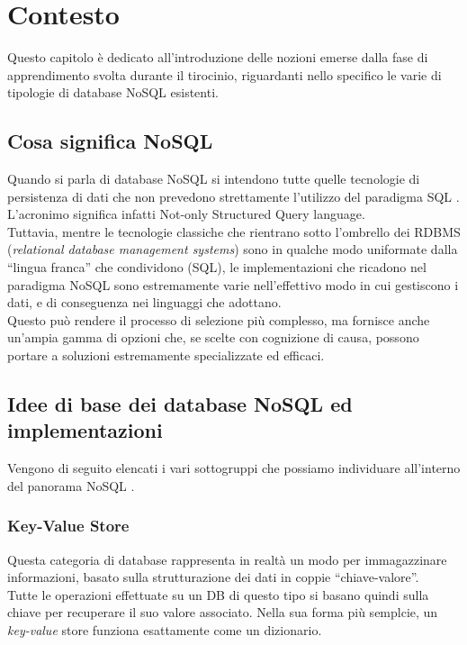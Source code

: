 
\chapter{Contesto}
\label{cap:contesto}

Questo capitolo è dedicato all'introduzione delle nozioni emerse dalla fase di apprendimento svolta durante il tirocinio, riguardanti nello specifico le varie di tipologie di database NoSQL esistenti.\\

\section{Cosa significa NoSQL}
Quando si parla di database NoSQL si intendono tutte quelle tecnologie di persistenza di dati che non prevedono strettamente l'utilizzo del paradigma \gls{SQL} \cite{site:mongoarticlenosql}. L'acronimo significa infatti Not-only Structured Query language.\\
Tuttavia, mentre le tecnologie classiche che rientrano sotto l'ombrello dei RDBMS (\textit{relational database management systems}) sono in qualche modo uniformate dalla ``lingua franca'' che condividono (\gls{SQL}), le implementazioni che ricadono nel paradigma NoSQL sono estremamente varie nell'effettivo modo in cui gestiscono i dati, e di conseguenza nei linguaggi che adottano.\\
Questo può rendere il processo di selezione più complesso, ma fornisce anche un'ampia gamma di opzioni che, se scelte con cognizione di causa, possono portare a soluzioni estremamente specializzate ed efficaci.\\


\section{Idee di base dei database NoSQL ed implementazioni}
Vengono di seguito elencati i vari sottogruppi che possiamo individuare all'interno del panorama NoSQL \cite{site:mongoarticletypes}.\\

\subsection{Key-Value Store}
Questa categoria di database rappresenta in realtà un modo per immagazzinare informazioni, basato sulla strutturazione dei dati in coppie ``chiave-valore''.\\
Tutte le operazioni effettuate su un DB di questo tipo si basano quindi sulla chiave per recuperare il suo valore associato. Nella sua forma più semplcie, un \textit{key-value} store funziona esattamente come un dizionario.\\

